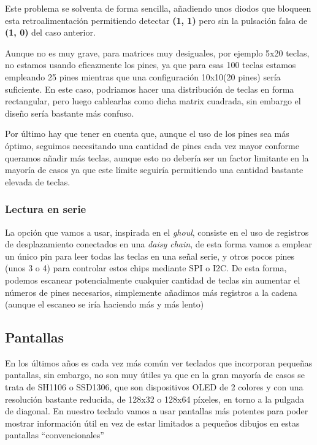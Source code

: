     Este problema se solventa de forma sencilla, añadiendo unos diodos que bloqueen esta retroalimentación permitiendo detectar \textbf{(1, 1)} pero sin la pulsación falsa de \textbf{(1, 0)} del caso anterior.

    Aunque no es muy grave, para matrices muy desiguales, por ejemplo 5x20 teclas, no estamos usando eficazmente los pines, ya que para esas 100 teclas estamos empleando 25 pines mientras que una configuración 10x10(20 pines) sería suficiente. \newline
    En este caso, podriamos hacer una distribución de teclas en forma rectangular, pero luego cablearlas como dicha matrix cuadrada, sin embargo el diseño sería bastante más confuso. \par

    Por último hay que tener en cuenta que, aunque el uso de los pines sea más óptimo, seguimos necesitando una cantidad de pines cada vez mayor conforme queramos añadir más teclas, aunque esto no debería ser un factor limitante en la mayoría de casos ya que este límite seguiría permitiendo una cantidad bastante elevada de teclas.

    \subsubsection{Lectura en serie}
    La opción que vamos a usar, inspirada en el \textit{ghoul}\cite{ghoul}, consiste en el uso de registros de desplazamiento conectados en una \textit{daisy chain}, de esta forma vamos a emplear un único pin para leer todas las teclas en una señal serie, y otros pocos pines (unos 3 o 4) para controlar estos chips mediante SPI\cite{spi} o I2C\cite{i2c}. De esta forma, podemos escanear potencialmente cualquier cantidad de teclas sin aumentar el números de pines necesarios, simplemente añadimos más registros a la cadena (aunque el escaneo se iría haciendo más y más lento)

\subsection{Pantallas}
En los últimos años es cada vez más común ver teclados que incorporan pequeñas pantallas, sin embargo, no son muy útiles ya que en la gran mayoría de casos se trata de SH1106 o SSD1306, que son dispositivos OLED de 2 colores y con una resolución bastante reducida, de 128x32 o 128x64 píxeles, en torno a la pulgada de diagonal. En nuestro teclado vamos a usar pantallas más potentes para poder mostrar información útil en vez de estar limitados a pequeños dibujos en estas pantallas ``convencionales''

